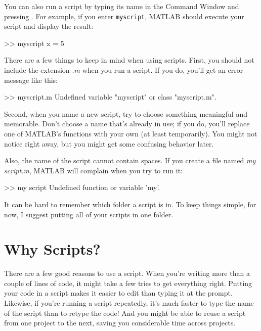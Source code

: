 You can also run a script by typing its name in the Command Window and pressing . For example, if you enter \lstinline{myscript}, MATLAB should execute your script and display the result:

\begin{code}
>> myscript
x = 5
\end{code}

There are a few things to keep in mind when using scripts. First, you should not include the extension \emph{.m} when you run a script.  If you do, you'll get an error message like this:

\begin{code}
>> myscript.m
Undefined variable "myscript" or class "myscript.m".
\end{code}

Second, when you name a new script, try to choose something meaningful and memorable.
Don't choose a name that's already in use; if you do, you'll replace one of MATLAB's functions with your own (at least temporarily).
You might not notice right away, but you might get some confusing behavior later.


Also, the name of the script cannot contain spaces.  If you create
a file named \emph{my script.m}, MATLAB will complain when you try
to run it:

\begin{code}
>> my script
Undefined function or variable 'my'.
\end{code}

It can be hard to remember which folder a script is in.  To keep things simple,
for now, I suggest putting all of your scripts in one folder.

\section{Why Scripts?}

There are a few good reasons to use a script. When you're writing more than a couple of lines of code, it might take a few tries to get everything right.  Putting your code
in a script makes it easier to edit than typing it at the prompt. Likewise, if you're running a script repeatedly, it's much faster to type the name of the script than to retype the code! And you might be able to reuse a script from one project to the next, saving you considerable time across projects.



